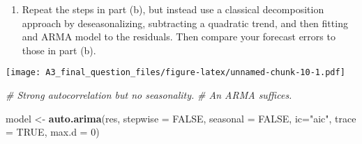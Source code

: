 \documentclass[]{article}
\newenvironment{Shaded}{\begin{snugshade}}{\end{snugshade}}
\newcommand{\CommentTok}[1]{\textcolor[rgb]{0.56,0.35,0.01}{\textit{#1}}}
\newcommand{\DataTypeTok}[1]{\textcolor[rgb]{0.13,0.29,0.53}{#1}}
\newcommand{\DecValTok}[1]{\textcolor[rgb]{0.00,0.00,0.81}{#1}}
\newcommand{\KeywordTok}[1]{\textcolor[rgb]{0.13,0.29,0.53}{\textbf{#1}}}
\newcommand{\NormalTok}[1]{#1}
\newcommand{\OperatorTok}[1]{\textcolor[rgb]{0.81,0.36,0.00}{\textbf{#1}}}
\newcommand{\OtherTok}[1]{\textcolor[rgb]{0.56,0.35,0.01}{#1}}
\newcommand{\StringTok}[1]{\textcolor[rgb]{0.31,0.60,0.02}{#1}}
\providecommand{\tightlist}{%
  \setlength{\itemsep}{0pt}\setlength{\parskip}{0pt}}
\begin{document}
\begin{enumerate}
\def\labelenumi{(\alph{enumi})}
\setcounter{enumi}{2}
\tightlist
\item
  Repeat the steps in part (b), but instead use a classical
  decomposition approach by deseasonalizing, subtracting a quadratic
  trend, and then fitting and ARMA model to the residuals. Then compare
  your forecast errors to those in part (b).
\end{enumerate}

\begin{Shaded}
\end{Shaded}

\texttt{[image: A3\_final\_question\_files/figure-latex/unnamed-chunk-10-1.pdf]}

\begin{Shaded}
\begin{Highlighting}[]
\CommentTok{# Strong autocorrelation but no seasonality.}
\CommentTok{# An ARMA suffices.}
\end{Highlighting}
\end{Shaded}

\begin{Shaded}
\begin{Highlighting}[]
\NormalTok{model <-}\StringTok{ }\KeywordTok{auto.arima}\NormalTok{(res, }\DataTypeTok{stepwise =} \OtherTok{FALSE}\NormalTok{, }\DataTypeTok{seasonal =} \OtherTok{FALSE}\NormalTok{, }\DataTypeTok{ic=}\StringTok{"aic"}\NormalTok{, }\DataTypeTok{trace =} \OtherTok{TRUE}\NormalTok{, }\DataTypeTok{max.d =} \DecValTok{0}\NormalTok{)}
\end{Highlighting}
\end{Shaded}
\end{document}
